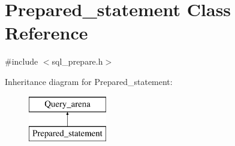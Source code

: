 \hypertarget{classPrepared__statement}{}\section{Prepared\+\_\+statement Class Reference}
\label{classPrepared__statement}


{\ttfamily \#include $<$sql\+\_\+prepare.\+h$>$}

Inheritance diagram for Prepared\+\_\+statement\+:\begin{figure}[H]
\begin{center}
\leavevmode
\includegraphics[height=2.000000cm]{classPrepared__statement}
\end{center}
\end{figure}
